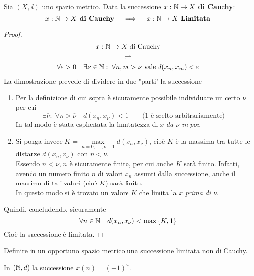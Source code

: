 \begin{proposition}
	\label{prop:se_cau_allora_lim}
	Sia $(X,d)$ uno spazio metrico. Data la successione $x: \mathbb{N} \to X$ \textbf{di Cauchy}:
	\[x: \mathbb{N} \to X \text{\textbf{ di Cauchy}} \quad \implies \quad x: \mathbb{N} \to X \text{ \textbf{Limitata}}\]
	\begin{proof}
		\begin{equation*}
			\begin{gathered}
				x: \mathbb{N} \to X \text{ di Cauchy}\\
				\rightleftharpoons\\
				\forall \varepsilon > 0\quad \exists \nu \in \mathbb{N}:\; \forall n,m > \nu \text{ vale } d(x_n, x_m) < \varepsilon
			\end{gathered}
		\end{equation*}
		La dimostrazione prevede di dividere in due "parti" la successione
		\begin{enumerate}
			\item Per la definizione di cui sopra è sicuramente possibile individuare un certo $\overline{\nu}$ per cui
				\[\exists \overline{\nu}:\; \forall n > \overline{\nu} \quad d(x_n, x_{\overline{\nu}}) < 1 \qquad \text{(1 è scelto arbitrariamente)}\]
				In tal modo è stata esplicitata la limitatezza di $x$ \textit{da $\overline{\nu}$ in poi}.
			\item Si ponga invece $K = \max\limits_{n=0,\: \dotsc \:, \overline{\nu}-1} d(x_n, x_{\overline{\nu}})$, cioè $K$ è la massima tra tutte le distanze $d(x_n, x_{\overline{\nu}})$ con $n < \overline{\nu}$.\\
				Essendo $n < \overline{\nu}$, $n$ è sicuramente finito, per cui anche $K$ sarà finito. Infatti, avendo un numero finito $n$ di valori $x_n$ assunti dalla successione, anche il massimo di tali valori (cioè $K$) sarà finito.\\
				In questo modo si è trovato un valore $K$ che limita la $x$ \textit{prima di} $\overline{\nu}$.
		\end{enumerate}
		Quindi, concludendo, sicuramente
		\[\forall n \in \mathbb{N} \quad d(x_n, x_{\overline{\nu}}) < \max \left\{K, 1\right\}\]
		Cioè la successione è limitata.
	\end{proof}
\end{proposition}
\begin{exercise}
	\label{ex:succ_lim_non_cau}
	Definire in un opportuno spazio metrico una successione limitata non di Cauchy.
	\begin{solution}
		In $(\mathbb{N},d)$ la successione $x(n) = (-1)^n$.
	\end{solution}
\end{exercise}
